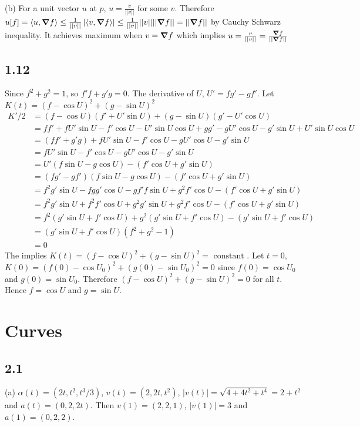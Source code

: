 \documentclass[12pt]{article}
\begin{document}
(b) For a unit vector $u$ at $p$, $u= \frac{v}{||v||}$ for some $v$. Therefore $u[f] = \langle u, \grad f \rangle \leq  \frac{1}{||v||}\left|\langle v, \grad f \rangle \right| \leq \frac{1}{||v||}||v|| ||\grad f|| = ||\grad f||$ by Cauchy Schwarz inequality. It achieves maximum when $v = \grad f $ which implies $u = \frac{v}{||v||} = \frac{\grad f}{||\grad f||}$

\subsection*{1.12}
Since $f^2 + g^2 = 1$, so $f'f + g'g = 0$. The derivative of $U$, $U'= fg' - gf'$.
Let $K(t) = (f - \cos U)^2 + (g - \sin U)^2$
$$
\begin{aligned}
	K'/2 &= (f - \cos U)(f' + U' \sin U ) + (g - \sin U) (g' -  U' \cos U) \\
	&=ff'+ fU'\sin U - f' \cos U -U' \sin U \cos U + gg' - gU'\cos U - g'\sin U + U'\sin U \cos U \\ 
	&=(ff'+g'g) + fU'\sin U - f' \cos U - gU'\cos U - g'\sin U \\
	&=  fU'\sin U - f' \cos U - gU'\cos U - g'\sin U \\
	&= U'(f \sin U - g \cos U) - (f' \cos U + g'\sin U) \\
	&= (fg' - gf')(f \sin U - g \cos U) - (f' \cos U + g'\sin U) \\
	&= f^2g'\sin U - fgg' \cos U - gf'f \sin U + g^2f' \cos U  - (f' \cos U + g'\sin U) \\
	&= f^2g'\sin U + f^2f' \cos U + g^2 g' \sin U + g^2 f' \cos U  - (f' \cos U + g'\sin U) \\
	&= f^2 (g'\sin U + f' \cos U) + g^2 (g' \sin U + f' \cos U ) - ( g'\sin U + f' \cos U) \\
	&=(g'\sin U + f' \cos U)(f^2 + g^2 - 1)\\
	&= 0
\end{aligned}
$$
The implies $K(t) = (f - \cos U)^2 + (g - \sin U)^2 = \mbox{ constant }$. Let $t=0$, $K(0) = (f(0) - \cos U_0)^2 + (g(0) - \sin U_0)^2 = 0$ since $f(0) = \cos U_0$ and $g(0) = \sin U_0$. Therefore $ (f - \cos U)^2 + (g - \sin U)^2  = 0$ for all $t$. Hence $f = \cos U$ and $g = \sin U$.\QED

\section{Curves}
\subsection*{2.1}
(a)  $\alpha(t) = (2t, t^2, t^3/3)$, $v(t) = (2, 2t, t^2)$, $|v(t)|= \sqrt{4+4t^2+t^4} = 2+t^2$ and $a(t) = (0, 2, 2t)$.  Then $v(1) = (2,2,1)$, $|v(1)| = 3$ and $a(1) = (0, 2, 2)$.
\end{document}
